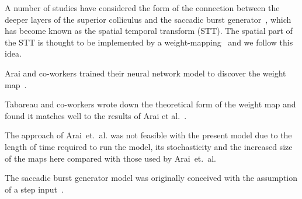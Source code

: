 \documentclass{frontiersSCNS}
\begin{document}
A number of studies have considered the form of the connection between
the deeper layers of the superior colliculus and the saccadic burst
generator~\cite{van_gisbergen_experimental_1985,ottes_visuomotor_1986,waitzman_superior_1991,groh_converting_2001,arai_model_2004,goossens_dynamic_2006,tabareau_geometry_2007,van_opstal_linear_2008,goossens_optimal_2012},
which has become known as the spatial temporal transform (STT).  The
spatial part of the STT is thought to be implemented by a
weight-mapping~\cite{tabareau_geometry_2007,arai_model_2004} and we
follow this idea.

Arai and co-workers trained their neural network model to discover the
weight map~\cite{arai_model_2004}.

Tabareau and co-workers wrote down the theoretical form of the weight
map and found it matches well to the results of Arai et
al.~\cite{tabareau_geometry_2007}.

The approach of Arai~et.~al. was
not feasible with the present model due to the length of time required
to run the model, its stochasticity and the increased size of the maps
here compared with those used by Arai~et.~al.

The saccadic burst generator model was originally conceived with the
assumption of a step input~\cite{gancarz_neural_1998}.
\end{document}
